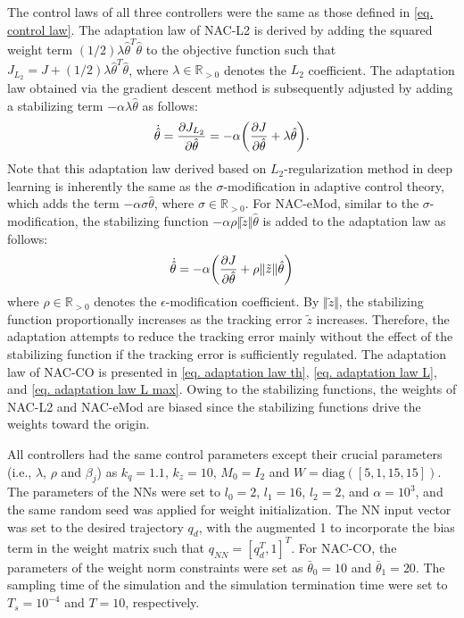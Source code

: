 \documentclass[letterpaper, 10 pt, conference]{ieeeconf}  %
\begin{document}
The control laws of all three controllers were the same as those defined in \eqref{eq. control law}.
The adaptation law of NAC-L2 is derived by adding the squared weight term $(1/2)\lambda\hat\theta^T\hat\theta$ to the objective function such that $J_{L_2} = J+(1/2)\lambda\hat\theta^T\hat\theta$, where $\lambda\in\mathbb R_{>0}$ denotes the $L_2$ coefficient.
The adaptation law obtained via the gradient descent method is subsequently adjusted by adding a stabilizing term $-\alpha\lambda\hat\theta$ as follows:
\begin{equation*} 
    \dot{\hat\theta} = 
    {\partial J_{L_2}\over\partial \hat\theta}
    =-\alpha
    \bigg(
        {\partial J\over\partial \hat\theta}+\lambda\hat\theta
    \bigg)
    .
    \label{eq. adap L2}
\end{equation*}
Note that this adaptation law derived based on $L_2$-regularization method in deep learning is inherently the same as the $\sigma$-modification in adaptive control theory, which adds the term $-\alpha\sigma\hat\theta$, where $\sigma\in\mathbb R_{>0}$.
For NAC-eMod, similar to the $\sigma$-modification, the stabilizing function $-\alpha\rho\Vert \tilde z \Vert\hat\theta$ is added to the adaptation law as follows:
\begin{equation*}
    \dot{\hat\theta} = -\alpha
    \bigg(
        {\partial J\over\partial \hat\theta}+\rho\Vert\tilde z\Vert\hat\theta
    \bigg)
    \label{eq. adap eMod}
\end{equation*}
where $\rho\in\mathbb R_{>0}$ denotes the $\epsilon$-modification coefficient.
By $\Vert\tilde z\Vert$, the stabilizing function proportionally increases as the tracking error $\tilde z$ increases.
Therefore, the adaptation attempts to reduce the tracking error mainly without the effect of the stabilizing function if the tracking error is sufficiently regulated.
The adaptation law of NAC-CO is presented in \eqref{eq. adaptation law th}, \eqref{eq. adaptation law L}, and \eqref{eq. adaptation law L max}.
Owing to the stabilizing functions, the weights of NAC-L2 and NAC-eMod are biased since the stabilizing functions drive the weights toward the origin.

All controllers had the same control parameters except their crucial parameters (i.e., $\lambda$, $\rho$ and $\beta_j$) as $k_q=1.1$, $k_z=10$, $M_0=I_2$ and $W=\text{diag}([5,1,15,15])$.
The parameters of the NNs were set to $l_0=2$, $l_1=16$, $l_2=2$, and $\alpha=10^3$, and the same random seed was applied for weight initialization.
The NN input vector was set to the desired trajectory $q_d$, with the augmented 1 to incorporate the bias term in the weight matrix such that $q_{NN}=[q_d^T,1]^T$.
For NAC-CO, the parameters of the weight norm constraints were set as $\bar\theta_0=10$ and $\bar\theta_1=20$.
The sampling time of the simulation and the simulation termination time were set to $T_s=10^{-4}$ and $T=10$, respectively.
\end{document}
